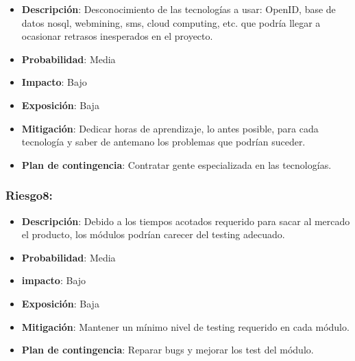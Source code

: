 \begin{itemize}
\itemsep1pt\parskip0pt
\item
  \textbf{Descripción}: Desconocimiento de las tecnologías a usar:
  OpenID, base de datos nosql, webmining, sms, cloud computing, etc. que
  podría llegar a ocasionar retrasos inesperados en el proyecto.
\item
  \textbf{Probabilidad}: Media
\item
  \textbf{Impacto}: Bajo
\item
  \textbf{Exposición}: Baja
\item
  \textbf{Mitigación}: Dedicar horas de aprendizaje, lo antes posible,
  para cada tecnología y saber de antemano los problemas que podrían
  suceder.
\item
  \textbf{Plan de contingencia}: Contratar gente especializada en las
  tecnologías.
\end{itemize}

\subsubsection{Riesgo8:}

\begin{itemize}
\itemsep1pt\parskip0pt
\item
  \textbf{Descripción}: Debido a los tiempos acotados requerido para
  sacar al mercado el producto, los módulos podrían carecer del testing
  adecuado.
\item
  \textbf{Probabilidad}: Media
\item
  \textbf{impacto}: Bajo
\item
  \textbf{Exposición}: Baja
\item
  \textbf{Mitigación}: Mantener un mínimo nivel de testing requerido en
  cada módulo.
\item
  \textbf{Plan de contingencia}: Reparar bugs y mejorar los test del
  módulo.
\end{itemize}
